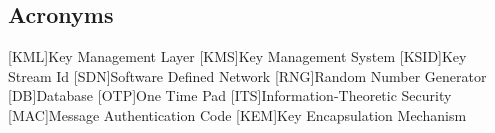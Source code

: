 \clearpage
\subsection*{Acronyms}\label{sec:acronyms}
\begin{acronym}[TDMA]
	[KML]{Key Management Layer}
	[KMS]{Key Management System}
	[KSID]{Key Stream Id}
	[SDN]{Software Defined Network}
	[RNG]{Random Number Generator}
	[DB]{Database}
	[OTP]{One Time Pad}
	[ITS]{Information-Theoretic Security}
	[MAC]{Message Authentication Code}
	[KEM]{Key Encapsulation Mechanism}
\end{acronym}
\pagebreak 
